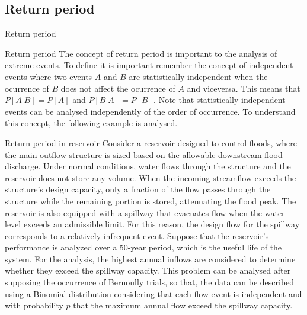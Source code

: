 \documentclass[8pt]{beamer}
\renewcommand{\emph}[1]{\textcolor{myorange}{#1}}
\begin{document}
\subsection{Return period}
\begin{frame}{Return period}
    \begin{block}{Return period}
        The concept of \alert{return period}  is important to the analysis of extreme events. To define it is important remember the concept of independent events where two events $A$ and $B$ are statistically independent when the ocurrence of $B$ does not affect the ocurrence of $A$ and viceversa. This means that $P[A | B] = P[A]$ and $P[B | A] = P[B]$. Note that statistically independent events can be analysed independently of the order of occurrence. 
        To understand this concept, the following example is analysed. 
 \begin{exampleblock}{Return period in reservoir} %
     Consider a reservoir designed to control floods, where the main outflow structure is sized based on the allowable downstream flood discharge. Under normal conditions, water flows through the structure and the reservoir does not store any volume. When the incoming streamflow exceeds the structure’s design capacity, only a fraction of the flow passes through the structure while the remaining portion is stored, attenuating the flood peak. The reservoir is also equipped with a spillway that evacuates flow when the water level exceeds an admissible limit. For this reason, the design flow for the spillway corresponds to a relatively infrequent event. Suppose that the reservoir’s performance is analyzed over a 50-year period, which is the useful life of the system. For the analysis, the highest annual inflows are considered to determine whether they exceed the spillway capacity. This problem can be analysed after supposing the occurrence of \emph{Bernoully trials}, so that, the data can be described using a \emph{Binomial distribution} considering that each flow event is independent and with probability $p$ that the maximum annual flow exceed the spillway capacity.  
 \end{exampleblock}
 
    \end{block}
\end{frame}
\end{document}
